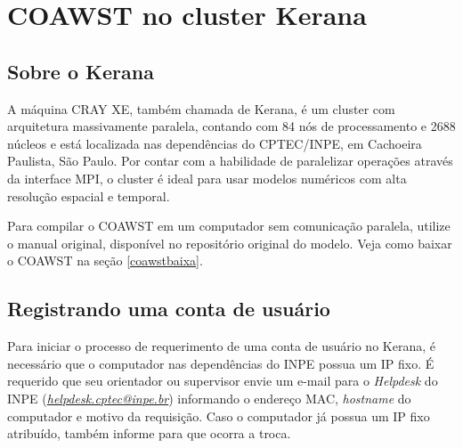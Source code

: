 
\chapter{COAWST no cluster Kerana}
\bigskip

\section{Sobre o Kerana}
\bigskip

\noindent A máquina CRAY XE, também chamada de Kerana, é um cluster com arquitetura massivamente paralela,
contando com 84 nós de processamento e 2688 núcleos e está localizada nas dependências do CPTEC/INPE,
em Cachoeira Paulista, São Paulo. Por contar com a habilidade de paralelizar operações através da interface
MPI, o cluster é ideal para usar modelos numéricos com alta resolução espacial
e temporal.
\bigskip


\begin{tcolorbox}[enhanced,
  grow to left by   = 0cm,
  grow to right by  = 0cm,
  enlarge top by    = 0cm,
  enlarge bottom by = 0cm,
  tcbox raise base,
  boxrule           = 1.0pt,
  left              = 18mm,
  colframe          = red!50!black,coltext=red!25!black,colback=red!10!white,
  overlay           = {\begin{tcbclipinterior}\fill[red!75!blue!50!white] (frame.south west)
    rectangle node[text=white,font=\sffamily\bfseries\footnotesize,rotate=0] {ATENÇÃO} ([xshift=18mm]frame.north west);\end{tcbclipinterior}}]
Para compilar o COAWST em um computador sem comunicação paralela, utilize o manual original, disponível no repositório original do modelo. Veja como baixar o COAWST na seção \textcolor{bleu_cite}{\ref{coawstbaixa}}.
\end{tcolorbox}
\bigskip

\section{Registrando uma conta de usuário}
\bigskip

\noindent Para iniciar o processo de requerimento de uma conta de usuário no Kerana, é necessário que o computador nas
          dependências do INPE possua um IP fixo. É requerido que seu orientador ou supervisor envie um e-mail para o \textit{Helpdesk} 
          do INPE  (\textcolor{bleu_cite}{\href{helpdesk.cptec@inpe.br}{\textit{helpdesk.cptec@inpe.br}}}) informando o endereço MAC, 
          \textit{hostname} do computador e motivo da requisição. Caso o computador já possua um IP fixo atribuído, também
           informe para que ocorra a troca.
\bigskip

